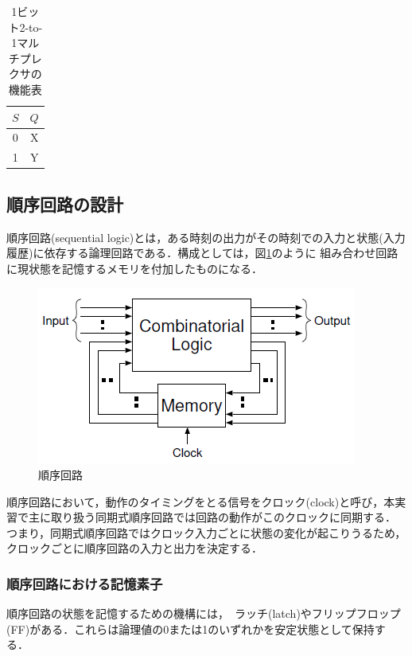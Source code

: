 \documentclass{jlreq}
\numberwithin{equation}{section}
\begin{document}
\begin{table}[H]
	\centering
	\caption{1ビット2-to-1マルチプレクサの機能表}
	\begin{tabular}{c|c}
		\hline
		$S$ & $Q$ \\ \hline
		0   & X   \\
		1   & Y   \\ \hline
	\end{tabular}
	\label{tab:2to1_mux_function}
\end{table}

\subsection{順序回路の設計}
順序回路(sequential logic)とは，ある時刻の出力がその時刻での入力と状態(入力履歴)に依存する論理回路である．構成としては，図\ref{fig:sequential_logic}のように
組み合わせ回路に現状態を記憶するメモリを付加したものになる．
\begin{figure}[H]
	\centering
	\includegraphics{assets/sequential_logic.png}
	\caption{順序回路}
	\label{fig:sequential_logic}
\end{figure}

順序回路において，動作のタイミングをとる信号をクロック(clock)と呼び，本実習で主に取り扱う同期式順序回路では回路の動作がこのクロックに同期する．
つまり，同期式順序回路ではクロック入力ごとに状態の変化が起こりうるため，クロックごとに順序回路の入力と出力を決定する．

\subsubsection{順序回路における記憶素子}
順序回路の状態を記憶するための機構には，　ラッチ(latch)やフリップフロップ(FF)がある．これらは論理値の0または1のいずれかを安定状態として保持する．
\end{document}

